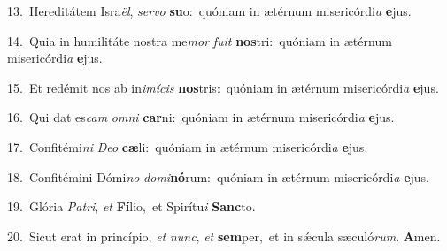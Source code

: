 {\numbfont\textcolor{\numbcolor}{13.}}~Hereditátem Isra\-\textit{ël}\-, \textit{ser}\-\textit{vo} \textbf{su}\-o:~\star quóniam in ætérnum misericórdi\textit{a} \textbf{e}\-jus.\par
{\numbfont\textcolor{\numbcolor}{14.}}~Quia in humilitáte nostra me\textit{mor} \textit{fu}\-\textit{it} \textbf{nos}\-tri:~\star quóniam in ætérnum misericórdi\textit{a} \textbf{e}\-jus.\par
{\numbfont\textcolor{\numbcolor}{15.}}~Et redémit nos ab in\-\textit{i}\-\textit{mí}\textit{cis} \textbf{nos}\-tris:~\star quóniam in ætérnum misericórdi\textit{a} \textbf{e}\-jus.\par
{\numbfont\textcolor{\numbcolor}{16.}}~Qui dat es\textit{cam} \textit{om}\-\textit{ni} \textbf{car}\-ni:~\star quóniam in ætérnum misericórdi\textit{a} \textbf{e}\-jus.\par
{\numbfont\textcolor{\numbcolor}{17.}}~Confitémi\textit{ni} \textit{De}\-\textit{o} \textbf{cæ}\-li:~\star quóniam in ætérnum misericórdi\textit{a} \textbf{e}\-jus.\par
{\numbfont\textcolor{\numbcolor}{18.}}~Confitémini Dómi\textit{no} \textit{do}\-\textit{mi}\textbf{nó}rum:~\star quóniam in ætérnum misericórdi\textit{a} \textbf{e}\-jus.\par
{\numbfont\textcolor{\numbcolor}{19.}}~Glória \textit{Pa}\-\textit{tri}, \textit{et} \textbf{Fí}\-lio,~\star et Spirítu\textit{i} \textbf{Sanc}\-to.\par
{\numbfont\textcolor{\numbcolor}{20.}}~Sicut erat in princípio, \textit{et} \textit{nunc}\-, \textit{et} \textbf{sem}\-per,~\star et in sǽcula sæculó\-\textit{rum}\-. \textbf{A}\-men.\par
